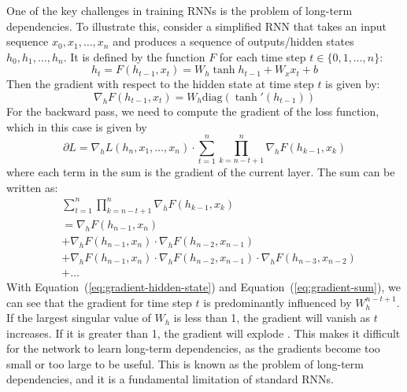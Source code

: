 \documentclass{article}
\newcommand{\refeqn}[1]{Equation~(\ref{#1})}
\begin{document}
One of the key challenges in training RNNs is the problem of long-term dependencies. To
illustrate this, consider a simplified RNN that takes an input sequence $x_0, x_1, \ldots,
  x_n$ and produces a sequence of outputs/hidden states $h_0, h_1, \ldots, h_n$. It is
defined by the function $F$ for each time step $t \in \{0, 1, \ldots, n\}$:
\begin{equation}
  h_t = F(h_{t-1}, x_t) = W_h \tanh{h_{t-1}} + W_x x_t + b
\end{equation}
Then the gradient with respect to the hidden state at time step $t$ is given by:
\begin{equation}
  \label{eq:gradient-hidden-state}
  \nabla_h F(h_{t-1}, x_t) = W_h \text{diag}(\tanh'(h_{t-1}))
\end{equation}
For the backward pass, we need to compute the gradient of the loss function, which in
this case is given by
\begin{equation}
  \partial L = \nabla_h L(h_n, x_1, \ldots, x_n) \cdot \sum_{t=1}^{n} \prod_{k=n-t+1}^{n} \nabla_h F(h_{k-1}, x_k)
\end{equation}
where each term in the sum is the gradient of the current layer. The sum can be written
as:
\begin{align}
   & \sum_{t=1}^{n} \prod_{k=n-t+1}^{n} \nabla_h F(h_{k-1}, x_k)                                      \label{eq:gradient-sum} \\
   & = \nabla_h F(h_{n-1}, x_n)                                                                       \nonumber               \\
   & + \nabla_h F(h_{n-1}, x_n) \cdot \nabla_h F(h_{n-2}, x_{n-1})                                    \nonumber               \\
   & + \nabla_h F(h_{n-1}, x_n) \cdot \nabla_h F(h_{n-2}, x_{n-1}) \cdot \nabla_h F(h_{n-3}, x_{n-2}) \nonumber               \\
   & + \ldots \nonumber
\end{align}
With \refeqn{eq:gradient-hidden-state} and \refeqn{eq:gradient-sum}, we can see that the
gradient for time step $t$ is predominantly influenced by $W_h^{n-t+1}$. If the largest
singular value of $W_h$ is less than 1, the gradient will vanish as $t$ increases. If it
is greater than 1, the gradient will explode
\cite{pascanuDifficultyTrainingRecurrent2013}. This makes it difficult for the network to
learn long-term dependencies, as the gradients become too small or too large to be useful.
This is known as the problem of long-term dependencies, and it is a fundamental limitation
of standard RNNs.
\end{document}
